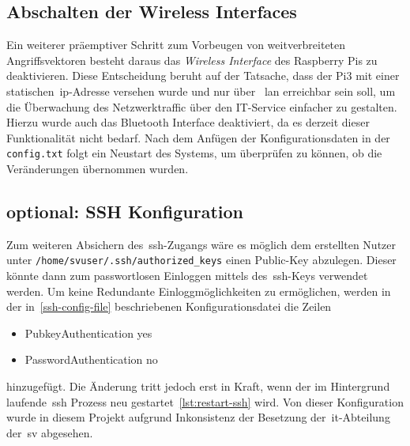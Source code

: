 \subsection{Abschalten der Wireless Interfaces}\label{subsec:abschalten-des-wireless-interface}
Ein weiterer präemptiver Schritt zum Vorbeugen von weitverbreiteten Angriffsvektoren besteht daraus das \textit{Wireless Interface} des Raspberry Pis zu deaktivieren.
Diese Entscheidung beruht auf der Tatsache, dass der Pi3 mit einer statischen~\gls{ip}-Adresse versehen wurde und nur über ~\gls{lan} erreichbar sein soll, um die Überwachung
des Netzwerktraffic über den IT-Service einfacher zu gestalten. \\

Hierzu wurde auch das Bluetooth Interface deaktiviert, da es derzeit dieser Funktionalität nicht bedarf.
Nach dem Anfügen der Konfigurationsdaten in der \texttt{config.txt} folgt ein Neustart des Systems, um überprüfen zu können, ob die Veränderungen übernommen wurden.
\subsection{optional: SSH Konfiguration}\label{subsec:ssh-konfiguration}
Zum weiteren Absichern des~\gls{ssh}-Zugangs wäre es möglich dem erstellten Nutzer unter \texttt{/home/svuser/.ssh/authorized\_keys} einen Public-Key abzulegen.
Dieser könnte dann zum passwortlosen Einloggen mittels des~\gls{ssh}-Keys verwendet werden.
Um keine Redundante Einloggmöglichkeiten zu ermöglichen, werden in der in~\ref{ssh-config-file} beschriebenen Konfigurationsdatei die Zeilen
\begin{itemize}
    \item PubkeyAuthentication yes
    \item PasswordAuthentication no
\end{itemize}
hinzugefügt.
Die Änderung tritt jedoch erst in Kraft, wenn der im Hintergrund laufende~\gls{ssh} Prozess neu gestartet~\ref{lst:restart-ssh} wird.
Von dieser Konfiguration wurde in diesem Projekt aufgrund Inkonsistenz der Besetzung der~\gls{it}-Abteilung der~\gls{sv} abgesehen.
